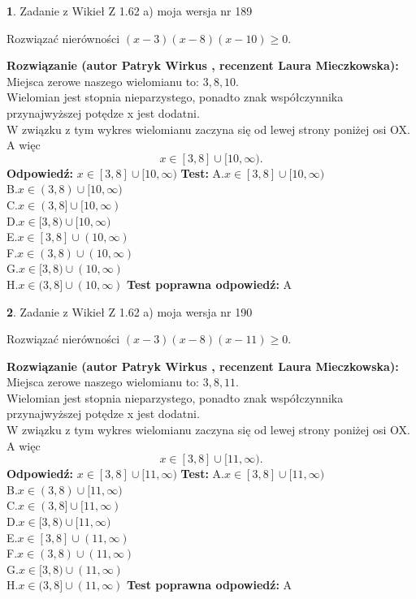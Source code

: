 \documentclass[12pt, a4paper]{article}
\theoremstyle{definition} %
\newtheorem{zad}{}
\newcommand{\zadStart}[1]{\begin{zad}#1\newline}
\newcommand{\zadStop}{\end{zad}}
\newcommand{\rozwStart}[2]{\noindent \textbf{Rozwiązanie (autor #1 , recenzent #2): }\newline}
\newcommand{\rozwStop}{\newline}
\newcommand{\odpStart}{\noindent \textbf{Odpowiedź:}\newline}
\newcommand{\odpStop}{\newline}
\newcommand{\testStart}{\noindent \textbf{Test:}\newline}
\newcommand{\testStop}{\newline}
\newcommand{\kluczStart}{\noindent \textbf{Test poprawna odpowiedź:}\newline}
\newcommand{\kluczStop}{\newline}
\begin{document}
\zadStart{Zadanie z Wikieł Z 1.62 a) moja wersja nr 189}

Rozwiązać nierówności $(x-3)(x-8)(x-10)\ge0$.
\zadStop
\rozwStart{Patryk Wirkus}{Laura Mieczkowska}
Miejsca zerowe naszego wielomianu to: $3, 8, 10$.\\
Wielomian jest stopnia nieparzystego, ponadto znak współczynnika przy\linebreak najwyższej potędze x jest dodatni.\\ W związku z tym wykres wielomianu zaczyna się od lewej strony poniżej osi OX. A więc $$x \in [3,8] \cup [10,\infty).$$
\rozwStop
\odpStart
$x \in [3,8] \cup [10,\infty)$
\odpStop
\testStart
A.$x \in [3,8] \cup [10,\infty)$\\
B.$x \in (3,8) \cup [10,\infty)$\\
C.$x \in (3,8] \cup [10,\infty)$\\
D.$x \in [3,8) \cup [10,\infty)$\\
E.$x \in [3,8] \cup (10,\infty)$\\
F.$x \in (3,8) \cup (10,\infty)$\\
G.$x \in [3,8) \cup (10,\infty)$\\
H.$x \in (3,8] \cup (10,\infty)$
\testStop
\kluczStart
A
\kluczStop



\zadStart{Zadanie z Wikieł Z 1.62 a) moja wersja nr 190}

Rozwiązać nierówności $(x-3)(x-8)(x-11)\ge0$.
\zadStop
\rozwStart{Patryk Wirkus}{Laura Mieczkowska}
Miejsca zerowe naszego wielomianu to: $3, 8, 11$.\\
Wielomian jest stopnia nieparzystego, ponadto znak współczynnika przy\linebreak najwyższej potędze x jest dodatni.\\ W związku z tym wykres wielomianu zaczyna się od lewej strony poniżej osi OX. A więc $$x \in [3,8] \cup [11,\infty).$$
\rozwStop
\odpStart
$x \in [3,8] \cup [11,\infty)$
\odpStop
\testStart
A.$x \in [3,8] \cup [11,\infty)$\\
B.$x \in (3,8) \cup [11,\infty)$\\
C.$x \in (3,8] \cup [11,\infty)$\\
D.$x \in [3,8) \cup [11,\infty)$\\
E.$x \in [3,8] \cup (11,\infty)$\\
F.$x \in (3,8) \cup (11,\infty)$\\
G.$x \in [3,8) \cup (11,\infty)$\\
H.$x \in (3,8] \cup (11,\infty)$
\testStop
\kluczStart
A
\kluczStop
\end{document}

